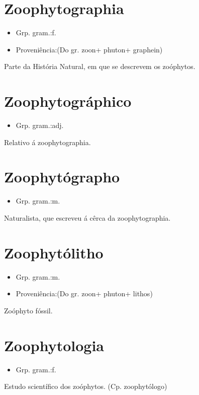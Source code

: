 \section{Zoophytographia}
\begin{itemize}
\item {Grp. gram.:f.}
\end{itemize}
\begin{itemize}
\item {Proveniência:(Do gr. \textunderscore zoon\textunderscore  + \textunderscore phuton\textunderscore  + \textunderscore graphein\textunderscore )}
\end{itemize}
Parte da História Natural, em que se descrevem os zoóphytos.
\section{Zoophytográphico}
\begin{itemize}
\item {Grp. gram.:adj.}
\end{itemize}
Relativo á zoophytographia.
\section{Zoophytógrapho}
\begin{itemize}
\item {Grp. gram.:m.}
\end{itemize}
Naturalista, que escreveu á cêrca da zoophytographia.
\section{Zoophytólitho}
\begin{itemize}
\item {Grp. gram.:m.}
\end{itemize}
\begin{itemize}
\item {Proveniência:(Do gr. \textunderscore zoon\textunderscore  + \textunderscore phuton\textunderscore  + \textunderscore lithos\textunderscore )}
\end{itemize}
Zoóphyto fóssil.
\section{Zoophytologia}
\begin{itemize}
\item {Grp. gram.:f.}
\end{itemize}
Estudo scientífico dos zoóphytos.
(Cp. \textunderscore zoophytólogo\textunderscore )
